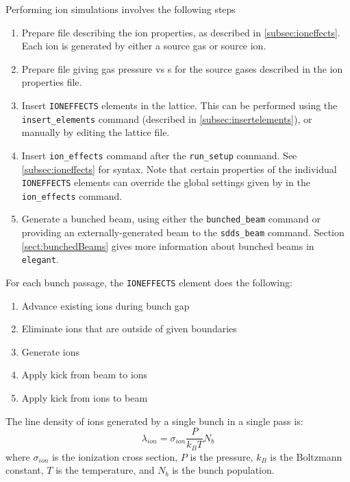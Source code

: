 Performing ion simulations involves the following steps
\begin{enumerate}
\item Prepare file describing the ion properties, as described in \ref{subsec:ioneffects}.
  Each ion is generated by either a source gas or source ion.
\item Prepare file giving gas pressure vs s for the source gases described in the ion 
  properties file.
\item Insert \verb|IONEFFECTS| elements in the lattice. This can be performed using the
  \verb|insert_elements| command (described in \ref{subsec:insertelements}), or
  manually by editing the lattice file.
\item Insert \verb|ion_effects| command after the \verb|run_setup| command. See
  \ref{subsec:ioneffects} for syntax.
  Note that certain properties of the individual \verb|IONEFFECTS| elements can override the
  global settings given by in the \verb|ion_effects| command.
\item Generate a bunched beam, using either the \verb|bunched_beam| command or providing
  an externally-generated beam to the \verb|sdds_beam| command. Section \ref{sect:bunchedBeams}
  gives more information about bunched beams in \verb|elegant|.
\end{enumerate}



For each bunch passage, the \verb|IONEFFECTS| element does the following:

\begin{enumerate}
\item Advance existing ions during bunch gap
\item Eliminate ions that are outside of given boundaries
\item Generate ions 
\item Apply kick from beam to ions 
\item Apply kick from ions to beam
\end{enumerate}


The line density of ions generated by a single bunch in a single pass is:
\begin{equation}
\lambda_{ion} = \sigma_{ion} \frac{P}{k_B T} N_b
\end{equation}
where $\sigma_{ion}$ is the ionization cross section, $P$ is the pressure, $k_B$ is the Boltzmann constant, $T$ is the temperature, and $N_b$ is the bunch population.


